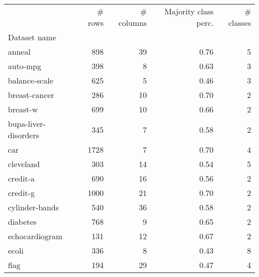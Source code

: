 \documentclass[a4paper,twoside,12pt]{book}
\begin{document}
\begin{table}[!htb]
\centering



\begin{tabular}{lrrrr}

\toprule
{} &  \# rows &  \# columns &  Majority class perc. &  \# classes \\
Dataset name            &         &            &                                        &            \\
\midrule
anneal                  &     898 &         39 &                                   0.76 &          5 \\
auto-mpg                &     398 &          8 &                                   0.63 &          3 \\
balance-scale           &     625 &          5 &                                   0.46 &          3 \\
breast-cancer           &     286 &         10 &                                   0.70 &          2 \\
breast-w                &     699 &         10 &                                   0.66 &          2 \\
bupa-liver-disorders    &     345 &          7 &                                   0.58 &          2 \\
car                     &    1728 &          7 &                                   0.70 &          4 \\
cleveland               &     303 &         14 &                                   0.54 &          5 \\
credit-a                &     690 &         16 &                                   0.56 &          2 \\
credit-g                &    1000 &         21 &                                   0.70 &          2 \\
cylinder-bands          &     540 &         36 &                                   0.58 &          2 \\
diabetes                &     768 &          9 &                                   0.65 &          2 \\
echocardiogram          &     131 &         12 &                                   0.67 &          2 \\
ecoli                   &     336 &          8 &                                   0.43 &          8 \\
flag                    &     194 &         29 &                                   0.47 &          4 \\

\end{tabular}
\end{table}
\end{document}
